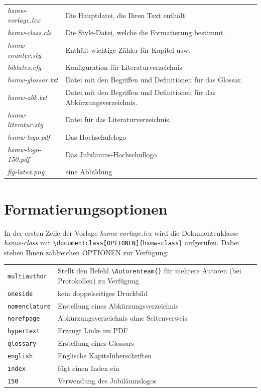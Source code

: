 \documentclass[nomenclature, norefpage, oneside, glossary, hypertext,multiauthor]{hsmw-class}
\begin{document}
\begin{tabular}{lp{}}
\textit{hsmw-vorlage.tex} & Die Hauptdatei, die Ihren Text enthält \\
\textit{hsmw-class.cls} & Die Style-Datei, welche die Formatierung bestimmt.\\
\textit{hsmw-counter.sty} & Enthält wichtige Zähler für Kapitel usw.\\
\textit{biblatex.cfg} & Konfiguration für Literaturverzeichnis\\
\textit{hsmw-glossar.txt} & Datei mit den Begriffen und Definitionen für das Glossar.\\
\textit{hsmw-abk.txt} & Datei mit den Begriffen und Definitionen für das Abkürzungsverzeichnis.\\
\textit{hsmw-literatur.sty} & Datei für das Literaturverzeichnis.\\
\textit{hsmw-logo.pdf} & Das Hochschulelogo\\
\textit{hsmw-logo-150.pdf} & Das Jubiläums-Hochschullogo\\
\textit{fig-latex.png} & eine Abbildung\\
\end{tabular}

\section{Formatierungsoptionen}
In der ersten Zeile der Vorlage \textit{hsmw-vorlage.tex} wird die Dokumentenklasse \textit{hsmw-class}  mit \verb+\documentclass[OPTIONEN]{hsmw-class}+ aufgerufen. Dabei stehen Ihnen zahlreichen OPTIONEN zur Verfügung:

\begin{tabular}{lp{}}
\texttt{multiauthor} & Stellt den Befehl \verb+\Autorenteam{}+ für mehrere Autoren (bei Protokollen) zu Verfügung \\
\texttt{oneside} & kein doppelseitiges Druckbild \\
\texttt{nomenclature} & Erstellung eines Abkürzungsverzeichnis \\
\texttt{norefpage} & Abkürzungsverzeichnis ohne Seitenverweis \\
\texttt{hypertext} & Erzeugt Links im PDF \\
\texttt{glossary} & Erstellung eines Glossars \\
\texttt{english} & Englische Kapitelüberschriften \\
\texttt{index} & fügt einen Index ein \\
\texttt{150} & Verwendung des Jubiläumslogos \\
\end{tabular}
\end{document}
